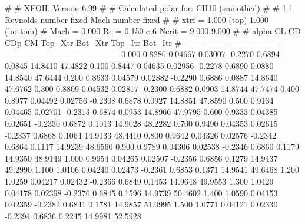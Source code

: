 #  
#       XFOIL         Version 6.99
#  
# Calculated polar for: CH10 (smoothed)                                 
#  
# 1 1 Reynolds number fixed          Mach number fixed         
#  
# xtrf =   1.000 (top)        1.000 (bottom)  
# Mach =   0.000     Re =     0.150 e 6     Ncrit =   9.000  9.000
#  
#   alpha    CL        CD       CDp       CM     Top_Xtr  Bot_Xtr  Top_Itr  Bot_Itr
#  ------ -------- --------- --------- -------- -------- -------- -------- --------
   0.000   0.8286   0.04667   0.03007  -0.2270   0.6894   0.0845  14.8410  47.4822
   0.100   0.8447   0.04635   0.02956  -0.2278   0.6890   0.0880  14.8540  47.6444
   0.200   0.8633   0.04579   0.02882  -0.2290   0.6886   0.0887  14.8640  47.6762
   0.300   0.8809   0.04532   0.02817  -0.2300   0.6882   0.0903  14.8744  47.7474
   0.400   0.8977   0.04492   0.02756  -0.2308   0.6878   0.0927  14.8851  47.8590
   0.500   0.9134   0.04465   0.02701  -0.2313   0.6874   0.0953  14.8966  47.9795
   0.600   0.9333   0.04385   0.02651  -0.2330   0.6872   0.1013  14.9028  48.2282
   0.700   0.9490   0.04353   0.02615  -0.2337   0.6868   0.1064  14.9133  48.4410
   0.800   0.9642   0.04326   0.02576  -0.2342   0.6864   0.1117  14.9239  48.6560
   0.900   0.9789   0.04306   0.02538  -0.2346   0.6860   0.1179  14.9350  48.9149
   1.000   0.9954   0.04265   0.02507  -0.2356   0.6856   0.1279  14.9437  49.2990
   1.100   1.0106   0.04240   0.02473  -0.2361   0.6853   0.1371  14.9541  49.6468
   1.200   1.0259   0.04217   0.02432  -0.2366   0.6849   0.1453  14.9648  49.9553
   1.300   1.0429   0.04178   0.02398  -0.2376   0.6845   0.1596  14.9739  50.4602
   1.400   1.0590   0.04153   0.02359  -0.2382   0.6841   0.1781  14.9857  51.0995
   1.500   1.0771   0.04121   0.02330  -0.2394   0.6836   0.2245  14.9981  52.5928
